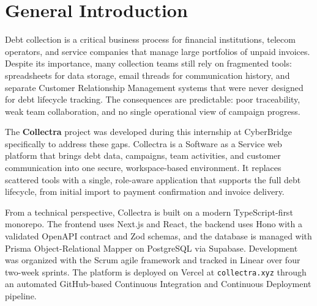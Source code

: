 \documentclass[12pt,a4paper]{report}
\begin{document}
\clearpage


\hypersetup{linkcolor=black, urlcolor=black, citecolor=black}
\tableofcontents
\clearpage


\listoffigures
\clearpage


\listoftables
\clearpage
{}
\setcounter{page}{1}
\hypersetup{linkcolor=blue, urlcolor=blue, citecolor=blue}

\chapter*{General Introduction}
{}

Debt collection is a critical business process for financial institutions, telecom
operators, and service companies that manage large portfolios of unpaid invoices.
Despite its importance, many collection teams still rely on fragmented tools:
spreadsheets for data storage, email threads for communication history, and separate
Customer Relationship Management systems that were never designed for debt lifecycle tracking.
The consequences are predictable: poor traceability, weak team collaboration, and no
single operational view of campaign progress.

The \textbf{Collectra} project was developed during this internship at CyberBridge 
specifically to address these gaps.
Collectra is a Software as a Service web platform that brings debt data, campaigns, team activities,
and customer communication into one secure, workspace-based environment.
It replaces scattered tools with a single, role-aware application that supports the
full debt lifecycle, from initial import to payment confirmation and invoice delivery.

From a technical perspective, Collectra is built on a modern TypeScript-first monorepo.
The frontend uses Next.js and React, the backend uses Hono with a validated OpenAPI
contract and Zod schemas, and the database is managed with Prisma Object-Relational Mapper on PostgreSQL
via Supabase.
Development was organized with the Scrum agile framework and tracked in Linear over
four two-week sprints.
The platform is deployed on Vercel at \texttt{collectra.xyz} through an automated
GitHub-based Continuous Integration and Continuous Deployment pipeline.
\end{document}
